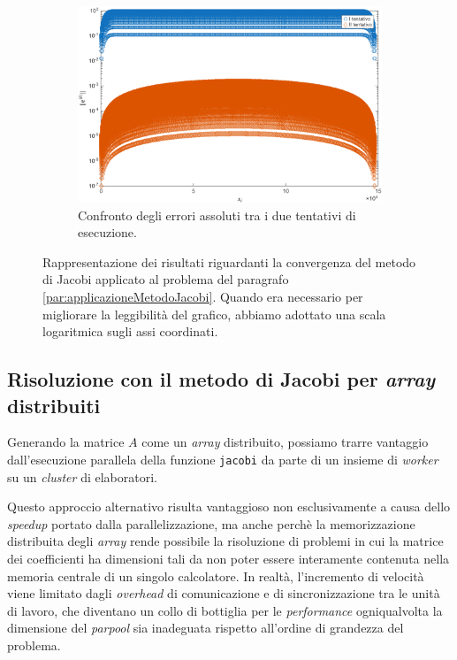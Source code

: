 \begin{figure}[!htbp]
    \vspace{1.5em}

     \begin{subfigure}{0.6\textwidth}
        \centering
        \includegraphics[width=\linewidth]{../Risorse/Capitolo 3/confrontoErroriAssoluti.png}
        \caption{Confronto degli errori assoluti tra i due tentativi di esecuzione.}
        \label{fig:confrontoErroriAssoluti}
    \end{subfigure}
    \caption{Rappresentazione dei risultati riguardanti la convergenza del metodo di Jacobi applicato al problema del paragrafo \ref{par:applicazioneMetodoJacobi}.\newline
    Quando era necessario per migliorare la leggibilit\`a del grafico, abbiamo adottato una scala logaritmica sugli assi coordinati.}
    \label{fig:gruppoImmaginiAnalisiPrestazionale}
\end{figure}
\subsection{Risoluzione con il metodo di Jacobi per \textit{array} distribuiti}
Generando la matrice $A$ come un \textit{array} distribuito, possiamo trarre vantaggio dall'esecuzione parallela della funzione \lstinline{jacobi} da parte 
di un insieme di \textit{worker} su un \textit{cluster} di elaboratori.

Questo approccio alternativo risulta vantaggioso non esclusivamente a causa dello \textit{speedup} portato dalla parallelizzazione, ma anche perch\`e 
la memorizzazione distribuita degli \textit{array} rende possibile la risoluzione di problemi in cui la matrice dei coefficienti ha dimensioni 
tali da non poter essere interamente contenuta nella memoria centrale di un singolo calcolatore.\newline
In realt\`a, l'incremento di velocit\`a viene limitato dagli \textit{overhead} di comunicazione e di sincronizzazione tra le unit\`a di lavoro, che diventano un collo di bottiglia per le \textit{performance} ogniqualvolta la dimensione del \textit{parpool} sia inadeguata rispetto all'ordine di grandezza del problema.

